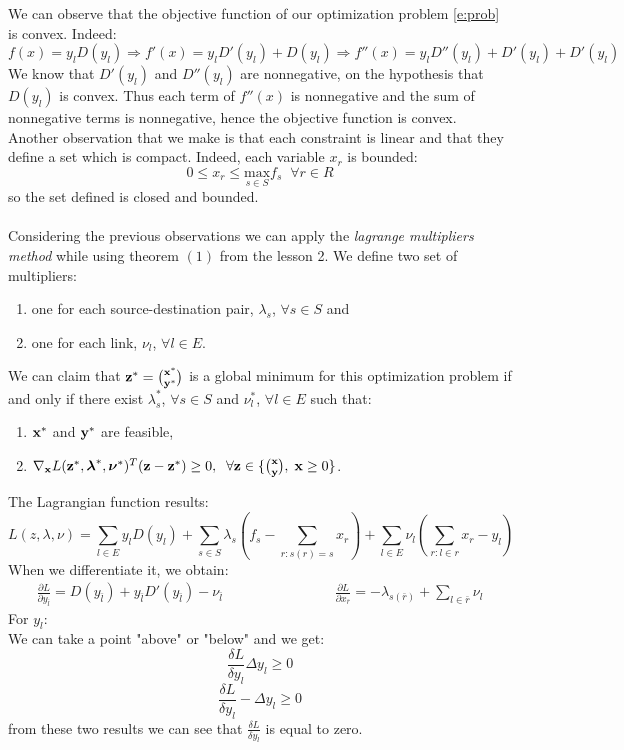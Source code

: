 We can observe that the objective function of our optimization problem \eqref{e:prob} is convex. Indeed:
\begin{equation}
f(x) = y_l D(y_l) \Rightarrow f'(x) = y_l D'(y_l) + D(y_l) \Rightarrow f''(x) = y_l D''(y_l) + D'(y_l) + D'(y_l)
\end{equation}
We know that $D'(y_l)$ and $D''(y_l)$ are nonnegative, on the hypothesis that $D(y_l)$ is convex. Thus each term of $f''(x)$ is nonnegative and the sum of nonnegative terms is nonnegative, hence the objective function is convex.\\
Another observation that we make is that each constraint is linear and that they define a set which is compact. Indeed, each variable $x_r$ is bounded:
\begin{equation}
0 \leq x_r \leq \underset{s \in S}{\text{max}} {f_s} \;\; \forall r \in R
\end{equation}
so the set defined is closed and bounded.\\\\
Considering the previous observations we can apply the \emph{lagrange multipliers method} while using  theorem $(1)$ from the lesson 2. We define two set of multipliers:
\begin{enumerate}
        \item one for each source-destination pair, $\lambda_s$, $ \forall s \in S$ and
        \item one for each link, $\nu_l$, $\forall l \in E$.
\end{enumerate}
We can claim that  $\mathbf{z}^* = {\mathbf{x}^* \choose \mathbf{y}^*}$ is a global minimum for this optimization problem if and only if there exist $\lambda_s^*$, $\forall s \in S$ and $\nu_l^*$, $\forall l \in E$ such that:
\begin{enumerate}
\item $\mathbf{x}^*$ and $\mathbf{y}^*$ are feasible,
\item $\nabla_{\mathbf{x}} L(\mathbf{z}^*,\boldsymbol{\lambda}^*,\boldsymbol{\nu}^*)^T (\mathbf{z} - \mathbf{z}^*) \ge 0,  \;\; \forall \mathbf{z} \in \{{\mathbf{x} \choose \mathbf{y}} ,\; \mathbf{x} \ge 0  \}$.
\end{enumerate}
The Lagrangian function results:
\begin{equation} 
L(z,\lambda,\nu)= \sum_{l \in E}  y_l D(y_l) + \sum_{s \in S} \lambda_{s} \left(f_s - \sum_{r:s(r)=s} x_r\right) + \sum_{l \in E} \nu_l \left(\sum_{r:l \in r} x_r - y_l\right) 
\end{equation}
When we differentiate it, we obtain:
\begin{equation}
\begin{aligned}
        \frac{\partial L}{\partial y_{\bar{l}}}=D(y_{\bar{l}})+  y_{\bar{l}} D'(y_{\bar{l}}) -  \nu_{\bar{l}}  &&&&& &&&&& \frac{\partial L}{\partial x_{\bar{r}}}=- \lambda_{s(\bar{r})} + \sum_{l \in \bar{r}} \nu_l
\end{aligned}
\end{equation}
For $y_l$:\\
We can take a point "above" or "below" and we get:
$$ \frac{\delta L}{\delta y_l} \Delta y_l \geq 0$$
$$ \frac{\delta L}{\delta y_l} -\Delta y_l \geq 0$$
from these two results we can see that $\frac{\delta L}{\delta y_l}$ is equal to zero.

